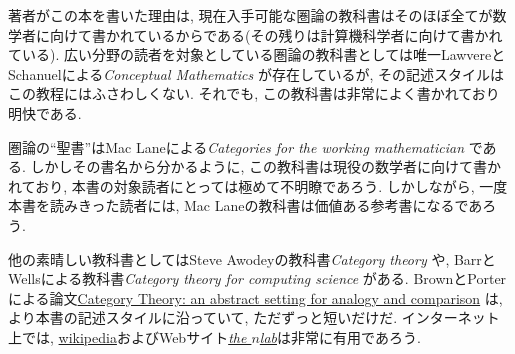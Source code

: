 著者がこの本を書いた理由は, 現在入手可能な圏論の教科書はそのほぼ全てが数学者に向けて書かれているからである(その残りは計算機科学者に向けて書かれている). 広い分野の読者を対象としている圏論の教科書としては唯一LawvereとSchanuelによる\emph{Conceptual Mathematics} \cite{LS}が存在しているが, その記述スタイルはこの教程にはふさわしくない. それでも, この教科書は非常によく書かれており明快である. 


圏論の``聖書''はMac Laneによる\emph{Categories for the working mathematician} \cite{Mac}である. しかしその書名から分かるように, この教科書は現役の数学者に向けて書かれており, 本書の対象読者にとっては極めて不明瞭であろう. しかしながら, 一度本書を読みきった読者には, Mac Laneの教科書は価値ある参考書になるであろう.


他の素晴しい教科書としてはSteve Awodeyの教科書\emph{Category theory} \cite{Awo}や, BarrとWellsによる教科書\emph{Category theory for computing science} \cite{BW}がある. BrownとPorterによる論文\href{http://pages.bangor.ac.uk/\%7Emas010/pdffiles/Analogy-and-Comparison.pdf}{\text Category Theory: an abstract setting for analogy and comparison} \cite{BP1}は, より本書の記述スタイルに沿っていて, ただずっと短いだけだ. インターネット上では, \href{http://www.wikipedia.org}{\text wikipedia}およびWebサイト\href{http://ncatlab.org/nlab/show/HomePage}{\em the $n$lab}は非常に有用であろう. 


